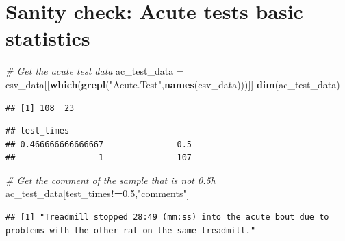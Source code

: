 \documentclass[]{article}
\newenvironment{Shaded}{\begin{snugshade}}{\end{snugshade}}
\newcommand{\KeywordTok}[1]{\textcolor[rgb]{0.13,0.29,0.53}{\textbf{#1}}}
\newcommand{\FloatTok}[1]{\textcolor[rgb]{0.00,0.00,0.81}{#1}}
\newcommand{\StringTok}[1]{\textcolor[rgb]{0.31,0.60,0.02}{#1}}
\newcommand{\CommentTok}[1]{\textcolor[rgb]{0.56,0.35,0.01}{\textit{#1}}}
\newcommand{\OperatorTok}[1]{\textcolor[rgb]{0.81,0.36,0.00}{\textbf{#1}}}
\newcommand{\NormalTok}[1]{#1}
\begin{document}
\section{Sanity check: Acute tests basic
statistics}\label{sanity-check-acute-tests-basic-statistics}

\begin{Shaded}
\begin{Highlighting}[]
\CommentTok{# Get the acute test data}
\NormalTok{ac_test_data =}\StringTok{ }\NormalTok{csv_data[[}\KeywordTok{which}\NormalTok{(}\KeywordTok{grepl}\NormalTok{(}\StringTok{"Acute.Test"}\NormalTok{,}\KeywordTok{names}\NormalTok{(csv_data)))]]}
\KeywordTok{dim}\NormalTok{(ac_test_data)}
\end{Highlighting}
\end{Shaded}

\begin{verbatim}
## [1] 108  23
\end{verbatim}

\begin{Shaded}
\end{Shaded}

\begin{verbatim}
## test_times
## 0.466666666666667               0.5 
##                 1               107
\end{verbatim}

\begin{Shaded}
\begin{Highlighting}[]
\CommentTok{# Get the comment of the sample that is not 0.5h}
\NormalTok{ac_test_data[test_times}\OperatorTok{!=}\FloatTok{0.5}\NormalTok{,}\StringTok{"comments"}\NormalTok{]}
\end{Highlighting}
\end{Shaded}

\begin{verbatim}
## [1] "Treadmill stopped 28:49 (mm:ss) into the acute bout due to problems with the other rat on the same treadmill."
\end{verbatim}
\end{document}
